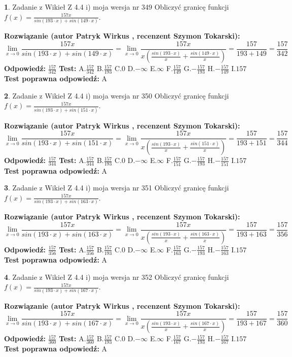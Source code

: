 \documentclass[12pt, a4paper]{article}
\theoremstyle{definition} %
\newtheorem{zad}{}
\newcommand{\zadStart}[1]{\begin{zad}#1\newline}
\newcommand{\zadStop}{\end{zad}}
\newcommand{\rozwStart}[2]{\noindent \textbf{Rozwiązanie (autor #1 , recenzent #2): }\newline}
\newcommand{\rozwStop}{\newline}
\newcommand{\odpStart}{\noindent \textbf{Odpowiedź:}\newline}
\newcommand{\odpStop}{\newline}
\newcommand{\testStart}{\noindent \textbf{Test:}\newline}
\newcommand{\testStop}{\newline}
\newcommand{\kluczStart}{\noindent \textbf{Test poprawna odpowiedź:}\newline}
\newcommand{\kluczStop}{\newline}
\begin{document}
\zadStart{Zadanie z Wikieł Z 4.4 i) moja wersja nr 349}
Obliczyć granicę funkcji $f(x)=\frac{157x}{sin(193\cdot x) +sin(149\cdot x)}$.
\zadStop
\rozwStart{Patryk Wirkus}{Szymon Tokarski}
$$\lim\limits_{x\to 0}\frac{157x}{sin(193\cdot x) +sin(149\cdot x)}=\lim\limits_{x\to 0}\frac{157x}{x(\frac{sin(193\cdot x)}{x}+\frac{sin(149\cdot x)}{x})}=\frac{157}{193+149} = \frac{157}{342}$$
\rozwStop
\odpStart
$\frac{157}{342}$
\odpStop
\testStart
A.$\frac{157}{342}$
B.$\frac{157}{193}$
C.$0$
D.$-\infty$
E.$\infty$
F.$\frac{157}{149}$
G.$-\frac{157}{193}$
H.$-\frac{157}{149}$
I.$157$
\testStop
\kluczStart
A
\kluczStop



\zadStart{Zadanie z Wikieł Z 4.4 i) moja wersja nr 350}
Obliczyć granicę funkcji $f(x)=\frac{157x}{sin(193\cdot x) +sin(151\cdot x)}$.
\zadStop
\rozwStart{Patryk Wirkus}{Szymon Tokarski}
$$\lim\limits_{x\to 0}\frac{157x}{sin(193\cdot x) +sin(151\cdot x)}=\lim\limits_{x\to 0}\frac{157x}{x(\frac{sin(193\cdot x)}{x}+\frac{sin(151\cdot x)}{x})}=\frac{157}{193+151} = \frac{157}{344}$$
\rozwStop
\odpStart
$\frac{157}{344}$
\odpStop
\testStart
A.$\frac{157}{344}$
B.$\frac{157}{193}$
C.$0$
D.$-\infty$
E.$\infty$
F.$\frac{157}{151}$
G.$-\frac{157}{193}$
H.$-\frac{157}{151}$
I.$157$
\testStop
\kluczStart
A
\kluczStop



\zadStart{Zadanie z Wikieł Z 4.4 i) moja wersja nr 351}
Obliczyć granicę funkcji $f(x)=\frac{157x}{sin(193\cdot x) +sin(163\cdot x)}$.
\zadStop
\rozwStart{Patryk Wirkus}{Szymon Tokarski}
$$\lim\limits_{x\to 0}\frac{157x}{sin(193\cdot x) +sin(163\cdot x)}=\lim\limits_{x\to 0}\frac{157x}{x(\frac{sin(193\cdot x)}{x}+\frac{sin(163\cdot x)}{x})}=\frac{157}{193+163} = \frac{157}{356}$$
\rozwStop
\odpStart
$\frac{157}{356}$
\odpStop
\testStart
A.$\frac{157}{356}$
B.$\frac{157}{193}$
C.$0$
D.$-\infty$
E.$\infty$
F.$\frac{157}{163}$
G.$-\frac{157}{193}$
H.$-\frac{157}{163}$
I.$157$
\testStop
\kluczStart
A
\kluczStop



\zadStart{Zadanie z Wikieł Z 4.4 i) moja wersja nr 352}
Obliczyć granicę funkcji $f(x)=\frac{157x}{sin(193\cdot x) +sin(167\cdot x)}$.
\zadStop
\rozwStart{Patryk Wirkus}{Szymon Tokarski}
$$\lim\limits_{x\to 0}\frac{157x}{sin(193\cdot x) +sin(167\cdot x)}=\lim\limits_{x\to 0}\frac{157x}{x(\frac{sin(193\cdot x)}{x}+\frac{sin(167\cdot x)}{x})}=\frac{157}{193+167} = \frac{157}{360}$$
\rozwStop
\odpStart
$\frac{157}{360}$
\odpStop
\testStart
A.$\frac{157}{360}$
B.$\frac{157}{193}$
C.$0$
D.$-\infty$
E.$\infty$
F.$\frac{157}{167}$
G.$-\frac{157}{193}$
H.$-\frac{157}{167}$
I.$157$
\testStop
\kluczStart
A
\kluczStop
\end{document}
